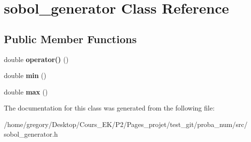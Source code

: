 \hypertarget{classsobol__generator}{}\section{sobol\+\_\+generator Class Reference}
\label{classsobol__generator}
\subsection*{Public Member Functions}
\begin{DoxyCompactItemize}
\item 
double {\bfseries operator()} ()\hypertarget{classsobol__generator_aa7956ddb88f92e8ca4b161ae68ce5ec9}{}\label{classsobol__generator_aa7956ddb88f92e8ca4b161ae68ce5ec9}

\item 
double {\bfseries min} ()\hypertarget{classsobol__generator_a31ab8182187885f740e5e05cf889af1d}{}\label{classsobol__generator_a31ab8182187885f740e5e05cf889af1d}

\item 
double {\bfseries max} ()\hypertarget{classsobol__generator_ab22cef51f007246f39754d55a287e70f}{}\label{classsobol__generator_ab22cef51f007246f39754d55a287e70f}

\end{DoxyCompactItemize}


The documentation for this class was generated from the following file\+:\begin{DoxyCompactItemize}
\item 
/home/gregory/\+Desktop/\+Cours\+\_\+\+E\+K/\+P2/\+Pages\+\_\+projet/test\+\_\+git/proba\+\_\+num/src/sobol\+\_\+generator.\+h\end{DoxyCompactItemize}

